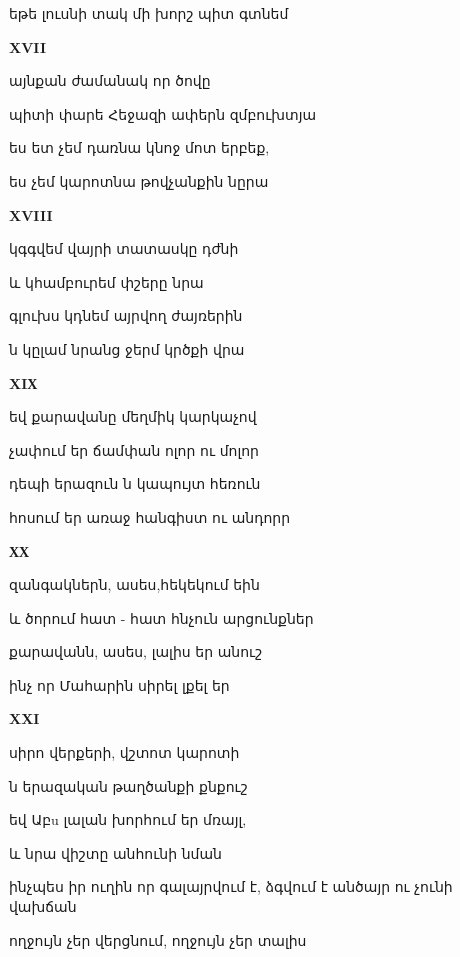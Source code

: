   եթե լուսնի տակ մի խորշ պիտ գտնեմ



\centerline{\bf XVII}


այնքան  ժամանակ որ ծովը


պիտի փարե Հեջազի ափերն զմբուխտյա 



ես ետ չեմ դառնա կնոջ մոտ երբեք, 



ես չեմ կարոտնա թովչանքին նըրա 

\centerline{\bf XVIII}

կգգվեմ վայրի տատասկը դժնի



 և կհամբուրեմ փշերը նրա


գլուխս կդնեմ այրվող ժայռերին 


ն կըլամ նրանց ջերմ կրծքի վրա  



\centerline{\bf XIХ}

 եվ քարավանը մեղմիկ կարկաչով 




չափում եր ճամփան ոլոր ու մոլոր



դեպի երազուն ն կապույտ հեռուն




հոսում եր առաջ հանգիստ ու անդորր


\centerline{\bf ХХ}




զանգակներն, ասես,հեկեկում  եին



և ծորում հատ - հատ հնչուն արցունքներ


քարավանն, ասես, լալիս եր անուշ


ինչ որ     Մահարին սիրել լքել եր





 

\centerline {\bf XXI}
սիրո վերքերի, վշտոտ  կարոտի 



ն երազական թաղծանքի քնքուշ


եվ Աբu  լալան խորհում եր մռայլ, 



և նրա վիշտը անհունի նման


ինչպես իր ուղին որ գալայրվում է, ձգվում է անծայր ու չունի վախճան



ողջույն չեր վերցնում, ողջույն չեր տալիս 


